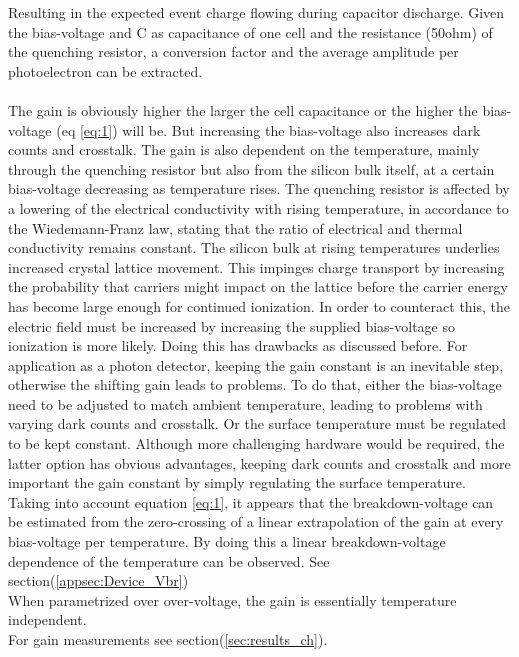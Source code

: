 \documentclass[12pt,article,type=msc,colorback,accentcolor=tud9c]{tudthesis}
\begin{document}
Resulting in the expected event charge flowing during capacitor discharge. Given the bias-voltage and C as capacitance of one cell and the resistance (50ohm) of the quenching resistor, a conversion factor and the average amplitude per photoelectron can be extracted.\\\\
The gain is obviously higher the larger the cell capacitance or the higher the bias-voltage (eq \ref{eq:1}) will be. But increasing the bias-voltage also increases dark counts and crosstalk. 
The gain is also dependent on the temperature, mainly through the quenching resistor but also from the silicon bulk itself, at a certain bias-voltage decreasing as temperature rises. The quenching resistor is affected by a lowering of the electrical conductivity with rising temperature, in accordance to the Wiedemann-Franz law, stating that the ratio of electrical and thermal conductivity remains constant. The silicon bulk at rising temperatures underlies increased crystal lattice movement. This impinges charge transport by increasing the probability that carriers might impact on the lattice before the carrier energy has become large enough for continued ionization. In order to counteract this, the electric field must be increased by increasing the supplied bias-voltage so ionization is more likely. Doing this has drawbacks as discussed before. For application as a photon detector, keeping the gain constant is an inevitable step, otherwise the shifting gain leads to problems. To do that, either the bias-voltage need to be adjusted to match ambient temperature, leading to problems with varying dark counts and crosstalk. Or the surface temperature must be regulated to be kept constant. Although more challenging hardware would be required, the latter option has obvious advantages, keeping dark counts and crosstalk and more important the gain constant by simply regulating the surface temperature.\\
Taking into account equation \ref{eq:1}, it appears that the breakdown-voltage can be estimated from the zero-crossing of a linear extrapolation of the gain at every bias-voltage per temperature. By doing this a linear breakdown-voltage dependence of the temperature can be observed. See section(\ref{appsec:Device_Vbr})\\
When parametrized over over-voltage, the gain is essentially temperature independent.\\
For gain measurements see section(\ref{sec:results_ch}).
\end{document}
